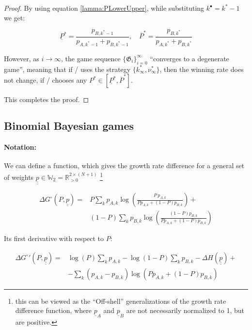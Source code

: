 \documentclass{article}
\theoremstyle{definition}
\begin{document}
\begin{proof}
By using equation \ref{lamma:PLowerUpper}, while substituting
$k^\bullet = k^* -1$ we get:

\begin{equation}
    \underline{P}^* = \frac{p_{B,k^*-1}}{p_{A,k^*-1}+p_{B,k^*-1}}, \quad
    \overline{P}^* = \frac{p_{B,k^*}}{p_{A,k^*}+p_{B,k^*}}
\end{equation}

However, as $i \to \infty$, the game sequence $\{\mathfrak{G}_i\}_{i=0}^\infty$ ``converges to a degenerate game'', meaning that if \PI/ uses the strategy $\{k^*_\infty, \nu^*_\infty\}$, then the winning rate does not change, if \PII/ chooses any $P^* \in [\underline{P}^*, \overline{P}^*]$.

This completes the proof.
    
\end{proof}

\subsection{Binomial Bayesian games}

\label{section:BinomialBayesianProof}

\paragraph{Notation:}

We can define a function, which gives the growth rate difference for a general set of weights $\underline{\underline{p}} \in \mathbb{W}_2 = \mathbb{R}_{>0}^{2 \times (N+1)}$ \footnote{this can be viewed as the ``Off-shell'' \cite{book:Weinberg} generalizations of the growth rate difference function, where $\underline{p}_A$ and $\underline{p}_B$ are not necessarily normalized to 1, but are positive.}

\begin{equation}
    \begin{split}
        \Delta G^\circ(P,\underline{\underline{p}}) =& P \sum_k p_{A,k} \log \left ( 
        \frac{P \ p_{A,k}}{P p_{A,k} + (1-P) p_{B,k}}  
        \right ) + \\
        & (1-P) \sum_k p_{B,k} \log \left ( 
        \frac{(1-P) p_{B,k}}{P p_{A,k} + (1-P) p_{B,k}}  
        \right )
    \end{split}
\end{equation}

Its first derivative with respect to $P$:

\begin{equation}
    \begin{split}
        \Delta G^\circ{}'(P,\underline{\underline{p}}) =& \log(P) \sum_k p_{A,k} - \log(1-P) \sum_k p_{B,k} - \Delta H(\underline{\underline{p}}) + \\
        & - \sum_k (p_{A,k}-p_{B,k}) \log(P p_{A,k} + (1-P) p_{B,k})
    \end{split}
\end{equation}
\end{document}
